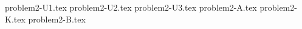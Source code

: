 \documentclass{article}
\begin{document}
{problem2-U1.tex}
{problem2-U2.tex}
{problem2-U3.tex}
{problem2-A.tex}
{problem2-K.tex}
{problem2-B.tex}
\end{document}
